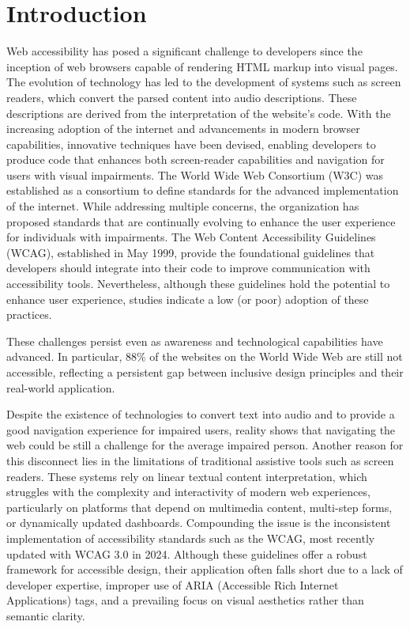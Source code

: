 \documentclass[conference]{IEEEtran}
\begin{document}
\section{Introduction}\label{intro}

Web accessibility has posed a significant challenge to developers since the inception of web browsers capable of rendering HTML markup into visual pages. The evolution of technology has led to the development of systems such as screen readers, which convert the parsed content into audio descriptions. These descriptions are derived from the interpretation of the website's code. With the increasing adoption of the internet and advancements in modern browser capabilities, innovative techniques have been devised, enabling developers to produce code that enhances both screen-reader capabilities and navigation for users with visual impairments. The World Wide Web Consortium (W3C) was established as a consortium to define standards for the advanced implementation of the internet. While addressing multiple concerns, the organization has proposed standards that are continually evolving to enhance the user experience for individuals with impairments. The Web Content Accessibility Guidelines (WCAG), established in May 1999, provide the foundational guidelines that developers should integrate into their code to improve communication with accessibility tools. Nevertheless, although these guidelines hold the potential to enhance user experience, studies indicate a low (or poor) adoption of these practices. \cite{abuaddous2016web, antonelli2018survey} 

These challenges persist even as awareness and technological capabilities have advanced. In particular, 88\% of the websites on the World Wide Web are still not accessible, reflecting a persistent gap between inclusive design principles and their real-world application. \cite{webaccess2024, martins2024large}

Despite the existence of technologies to convert text into audio and to provide a good navigation experience for impaired users, reality shows that navigating the web could be still a challenge for the average impaired person. Another reason for this disconnect lies in the limitations of traditional assistive tools such as screen readers. These systems rely on linear textual content interpretation, which struggles with the complexity and interactivity of modern web experiences, particularly on platforms that depend on multimedia content, multi-step forms, or dynamically updated dashboards. Compounding the issue is the inconsistent implementation of accessibility standards such as the WCAG, most recently updated with WCAG 3.0 in 2024. Although these guidelines offer a robust framework for accessible design, their application often falls short due to a lack of developer expertise, improper use of ARIA (Accessible Rich Internet Applications) tags, and a prevailing focus on visual aesthetics rather than semantic clarity. \cite{gbd2021, wcagchallenges2025}
\end{document}
